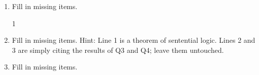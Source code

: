\begin{enumerate}
\begin{argumentN}[1]

\end{argumentN}




\item Fill in missing items.

\begin{argumentN}[1]




{1}



\end{argumentN}

\item Fill in missing items. Hint: Line 1 is a theorem of sentential logic.  
 Lines 2 and 3 are simply citing the results of Q3 and Q4; leave them untouched.
\begin{argumentN}[1]




{}



\end{argumentN}


\item Fill in missing items.

\begin{argumentN}[1]


\end{argumentN}
\end{enumerate}
